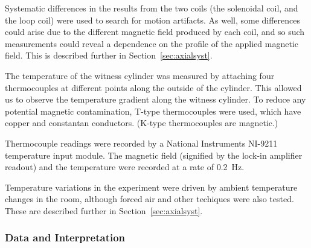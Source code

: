 Systematic differences in the results from the two coils (the
solenoidal coil, and the loop coil) were used to search for motion
artifacts.  As well, some differences could arise due to the different
magnetic field produced by each coil, and so such measurements could
reveal a dependence on the profile of the applied magnetic field.
This is described further in Section~\ref{sec:axialsyst}.




%


The temperature of the witness cylinder was measured by attaching four
thermocouples at different points along the outside of the cylinder.
This allowed us to observe the temperature gradient along the witness
cylinder.  To reduce any potential magnetic contamination, T-type
thermocouples were used, which have copper and constantan conductors.
(K-type thermocouples are magnetic.)

Thermocouple readings were recorded by a National Instruments NI-9211
temperature input module.  The magnetic field (signified by the
lock-in amplifier readout) and the temperature were recorded at a rate
of 0.2~Hz.

Temperature variations in the experiment were driven by ambient
temperature changes in the room, although forced air and other
techiques were also tested.  These are described further in
Section~\ref{sec:axialsyst}.


\subsubsection{Data and Interpretation}

